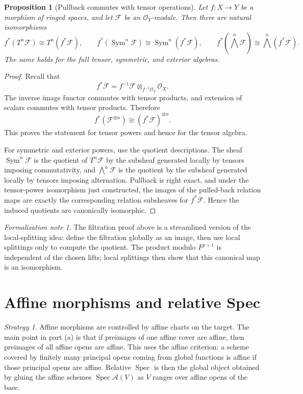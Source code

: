 \documentclass[11pt]{amsart}
\DeclareMathOperator{\Spec}{Spec}
\DeclareMathOperator{\Sym}{Sym}
\newcommand{\OO}{\mathcal O}
\newcommand{\F}{\mathscr F}
\newcommand{\A}{\mathscr A}
\theoremstyle{plain}
\newtheorem{proposition}[theorem]{Proposition}
\theoremstyle{definition}
\theoremstyle{remark}
\newtheorem*{strategy}{Strategy}
\newtheorem*{formalization}{Formalization note}
\begin{document}
\begin{proposition}[Pullback commutes with tensor operations]\label{prop:pullback-tensor-ops}
Let $f:X\to Y$ be a morphism of ringed spaces, and let $\F$ be an $\OO_Y$-module.  Then there are natural isomorphisms
\[
  f^*(T^n\F)\cong T^n(f^*\F),\qquad
  f^*(\Sym^n\F)\cong \Sym^n(f^*\F),\qquad
  f^*\left(\bigwedge^n\F\right)\cong \bigwedge^n(f^*\F).
\]
The same holds for the full tensor, symmetric, and exterior algebras.
\end{proposition}

\begin{proof}
Recall that
\[
  f^*\F = f^{-1}\F\otimes_{f^{-1}\OO_Y}\OO_X.
\]
The inverse image functor commutes with tensor products, and extension of scalars commutes with tensor products.  Therefore
\[
  f^*(\F^{\otimes n})
  \cong
  (f^*\F)^{\otimes n}.
\]
This proves the statement for tensor powers and hence for the tensor algebra.

For symmetric and exterior powers, use the quotient descriptions.  The sheaf $\Sym^n\F$ is the quotient of $T^n\F$ by the subsheaf generated locally by tensors imposing commutativity, and $\bigwedge^n\F$ is the quotient by the subsheaf generated locally by tensors imposing alternation.  Pullback is right exact, and under the tensor-power isomorphism just constructed, the images of the pulled-back relation maps are exactly the corresponding relation subsheaves for $f^*\F$.  Hence the induced quotients are canonically isomorphic.
\end{proof}

\begin{formalization}
The filtration proof above is a streamlined version of the local-splitting idea: define the filtration globally as an image, then use local splittings only to compute the quotient.  The product modulo $F^{p+1}$ is independent of the chosen lifts; local splittings then show that this canonical map is an isomorphism.
\end{formalization}

\section{Affine morphisms and relative Spec}

\begin{strategy}
Affine morphisms are controlled by affine charts on the target.  The main point in part (a) is that if preimages of one affine cover are affine, then preimages of all affine opens are affine.  This uses the affine criterion: a scheme covered by finitely many principal opens coming from global functions is affine if those principal opens are affine.  Relative $\Spec$ is then the global object obtained by gluing the affine schemes $\Spec \A(V)$ as $V$ ranges over affine opens of the base.
\end{strategy}
\end{document}
